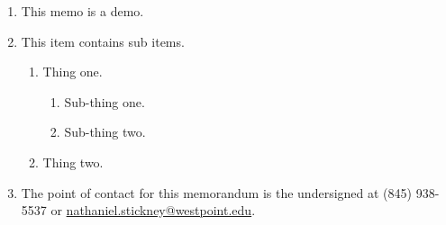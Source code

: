 \documentclass{armymemo}
\author{Nathaniel H. Stickney}\rank{MAJ}\branch{AV}%
\begin{document}
\begin{enumerate}
\item This memo is a demo.
\item This item contains sub items.
    \begin{enumerate}
    \item Thing one.
        \begin{enumerate}
        \item Sub-thing one.
        \item Sub-thing two.
        \end{enumerate}
    \item Thing two.
    \end{enumerate}
\item The point of contact for this memorandum is the undersigned at (845) 938-5537 or \href{mailto:nathaniel.stickney@westpoint.edu}{nathaniel.stickney@westpoint.edu}.
\end{enumerate}
\end{document}
